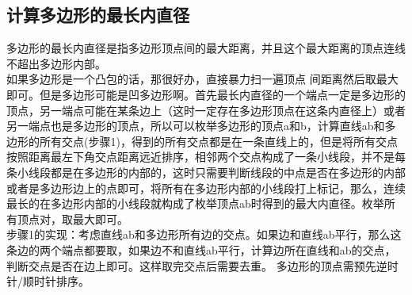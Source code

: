 \subsection{计算多边形的最长内直径}
多边形的最长内直径是指多边形顶点间的最大距离，并且这个最大距离的顶点连线不超出多边形内部。 \\
如果多边形是一个凸包的话，那很好办，直接暴力扫一遍顶点 间距离然后取最大即可。但是多边形可能是凹多边形啊。首先最长内直径的一个端点一定是多边形的顶点，另一端点可能在某条边上（这时一定存在多边形顶点在这条内直径上）或者另一端点也是多边形的顶点，所以可以枚举多边形的顶点a和b，计算直线ab和多边形的所有交点(步骤1)，得到的所有交点都是在一条直线上的，但是将所有交点按照距离最左下角交点距离远近排序，相邻两个交点构成了一条小线段，并不是每条小线段都是在多边形的内部的，这时只需要判断线段的中点是否在多边形的内部或者是多边形边上的点即可，将所有在多边形内部的小线段打上标记，那么，连续最长的在多边形内部的小线段就构成了枚举顶点ab时得到的最大内直径。枚举所有顶点对，取最大即可。 \\
步骤1的实现：考虑直线ab和多边形所有边的交点。如果边和直线ab平行，那么这条边的两个端点都要取，如果边不和直线ab平行，计算边所在直线和ab的交点，判断交点是否在边上即可。这样取完交点后需要去重。
多边形的顶点需预先逆时针/顺时针排序。
